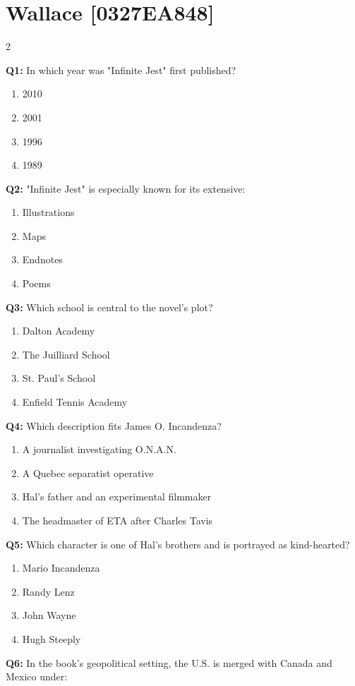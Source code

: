 \documentclass[10pt]{article}
\begin{document}
\section*{Wallace \footnotesize [0327EA848]}
\begin{multicols}{2}

\textbf{Q1:} In which year was "Infinite Jest" first published?

\begin{enumerate}[label=\arabic*.]
\item 2010
\item 2001
\item 1996
\item 1989
\end{enumerate}
\textbf{Q2:} "Infinite Jest" is especially known for its extensive:

\begin{enumerate}[label=\arabic*.]
\item Illustrations
\item Maps
\item Endnotes
\item Poems
\end{enumerate}
\textbf{Q3:} Which school is central to the novel's plot?

\begin{enumerate}[label=\arabic*.]
\item Dalton Academy
\item The Juilliard School
\item St. Paul's School
\item Enfield Tennis Academy
\end{enumerate}
\textbf{Q4:} Which description fits James O. Incandenza?

\begin{enumerate}[label=\arabic*.]
\item A journalist investigating O.N.A.N.
\item A Quebec separatist operative
\item Hal's father and an experimental filmmaker
\item The headmaster of ETA after Charles Tavis
\end{enumerate}
\textbf{Q5:} Which character is one of Hal's brothers and is portrayed as kind-hearted?

\begin{enumerate}[label=\arabic*.]
\item Mario Incandenza
\item Randy Lenz
\item John Wayne
\item Hugh Steeply
\end{enumerate}
\textbf{Q6:} In the book's geopolitical setting, the U.S. is merged with Canada and Mexico under:


\end{multicols}
\end{document}
